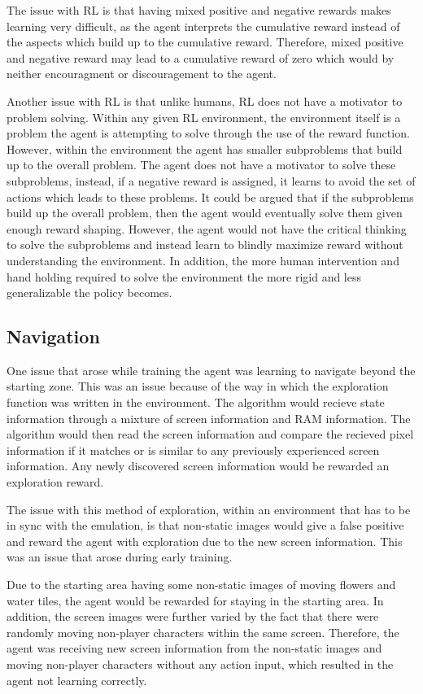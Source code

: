 The issue with RL is that having mixed positive and negative rewards makes learning very difficult, as the agent interprets the cumulative reward instead of the aspects  which build up to the cumulative reward. Therefore, mixed positive and negative reward may lead to a cumulative reward of zero which would by neither encouragment or discouragement to the agent. 

Another issue with RL is that unlike humans, RL does not have a motivator to problem solving. Within any given RL environment, the environment itself is a problem the agent is attempting to solve through the use of the reward function. However, within the environment the agent has smaller subproblems that build up to the overall problem. The agent does not have a motivator to solve these subproblems, instead, if a negative reward is assigned, it learns to avoid the set of actions which leads to these problems. It could be argued that if the subproblems build up the overall problem, then the agent would eventually solve them given enough reward shaping. However, the agent would not have the critical thinking to solve the subproblems and instead learn to blindly maximize reward without understanding the environment. In addition, the more human intervention and hand holding required to solve the environment the more rigid and less generalizable the policy becomes.

\subsection{Navigation}

One issue that arose while training the agent was learning to navigate beyond the starting zone. This was an issue because of the way in which the exploration function was written in the environment. The algorithm would recieve state information through a mixture of screen information and RAM information. The algorithm would then read the screen information and compare the recieved pixel information if it matches or is similar to any previously experienced screen information. Any newly discovered screen information would be rewarded an exploration reward. 

The issue with this method of exploration, within an environment that has to be in sync with the emulation, is that non-static images would give a false positive and reward the agent with exploration due to the new screen information. This was an issue that arose during early training. 

Due to the starting area having some non-static images of moving flowers and water tiles, the agent would be rewarded for staying in the starting area. In addition, the screen images were further varied by the fact that there were randomly moving non-player characters within the same screen. Therefore, the agent was receiving new screen information from the non-static images and moving non-player characters without any action input, which resulted in the agent not learning correctly.

